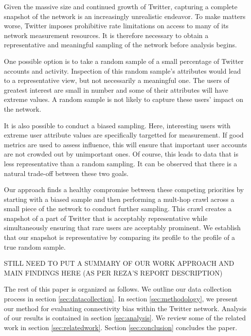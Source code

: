 Given the massive size and continued growth of Twitter, capturing a complete snapshot of the network is an increasingly unrealistic endeavor.  To make matters worse, Twitter imposes prohibitive rate limitations on access to many of its network measurement resources.  It is therefore necessary to obtain a representative and meaningful sampling of the network before analysis begins.

One possible option is to take a random sample of a small percentage of Twitter accounts and activity.  Inspection of this random sample's attributes would lead to a representative view, but not necessarily a meaningful one.  The users of greatest interest are small in number and some of their attributes will have extreme values.  A random sample is not likely to capture these users' impact on the network.

It is also possible to conduct a biased sampling.  Here, interesting users with extreme user attribute values are specifically targetted for measurement.  If good metrics are used to assess influence, this will ensure that important user accounts are not crowded out by unimportant ones.  Of course, this leads to data that is less representative than a random sampling.  It can be observed that there is a natural trade-off between these two goals.

Our approach finds a healthy compromise between these competing priorities by starting with a biased sample and then performing a mult-hop crawl across a small piece of the network to conduct further sampling.  This crawl creates a snapshot of a part of Twitter that is acceptably representative while simultaneously ensuring that rare users are acceptably prominent.  We establish that our snapshot is representative by comparing its profile to the profile of a true random sample.

STILL NEED TO PUT A SUMMARY OF OUR WORK APPROACH AND MAIN FINDINGS HERE (AS PER REZA'S REPORT DESCRIPTION)

The rest of this paper is organized as follows.  We outline our data collection process in section \ref{sec:datacollection}.  In section \ref{sec:methodology}, we present our method for evaluating connectivity bias within the Twitter network.  Analysis of our results is contained in section \ref{sec:analysis}.  We review some of the related work in section \ref{sec:relatedwork}.  Section \ref{sec:conclusion} concludes the paper.